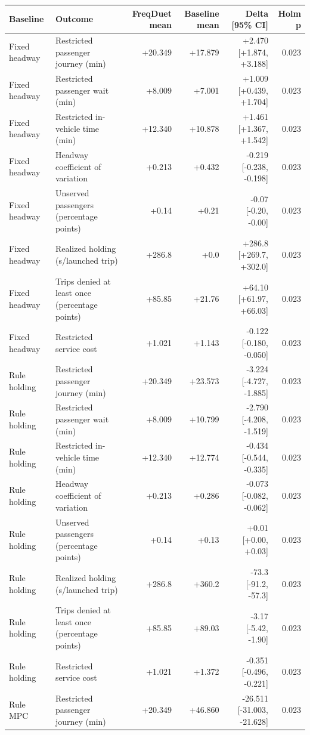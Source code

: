 \begin{tabular}{llrrrr}
\toprule
Baseline & Outcome & FreqDuet mean & Baseline mean & Delta [95\% CI] & Holm p \\
\midrule
Fixed headway & Restricted passenger journey (min) & +20.349 & +17.879 & +2.470 [+1.874, +3.188] & 0.023 \\
Fixed headway & Restricted passenger wait (min) & +8.009 & +7.001 & +1.009 [+0.439, +1.704] & 0.023 \\
Fixed headway & Restricted in-vehicle time (min) & +12.340 & +10.878 & +1.461 [+1.367, +1.542] & 0.023 \\
Fixed headway & Headway coefficient of variation & +0.213 & +0.432 & -0.219 [-0.238, -0.198] & 0.023 \\
Fixed headway & Unserved passengers (percentage points) & +0.14 & +0.21 & -0.07 [-0.20, -0.00] & 0.023 \\
Fixed headway & Realized holding (s/launched trip) & +286.8 & +0.0 & +286.8 [+269.7, +302.0] & 0.023 \\
Fixed headway & Trips denied at least once (percentage points) & +85.85 & +21.76 & +64.10 [+61.97, +66.03] & 0.023 \\
Fixed headway & Restricted service cost & +1.021 & +1.143 & -0.122 [-0.180, -0.050] & 0.023 \\
Rule holding & Restricted passenger journey (min) & +20.349 & +23.573 & -3.224 [-4.727, -1.885] & 0.023 \\
Rule holding & Restricted passenger wait (min) & +8.009 & +10.799 & -2.790 [-4.208, -1.519] & 0.023 \\
Rule holding & Restricted in-vehicle time (min) & +12.340 & +12.774 & -0.434 [-0.544, -0.335] & 0.023 \\
Rule holding & Headway coefficient of variation & +0.213 & +0.286 & -0.073 [-0.082, -0.062] & 0.023 \\
Rule holding & Unserved passengers (percentage points) & +0.14 & +0.13 & +0.01 [+0.00, +0.03] & 0.023 \\
Rule holding & Realized holding (s/launched trip) & +286.8 & +360.2 & -73.3 [-91.2, -57.3] & 0.023 \\
Rule holding & Trips denied at least once (percentage points) & +85.85 & +89.03 & -3.17 [-5.42, -1.90] & 0.023 \\
Rule holding & Restricted service cost & +1.021 & +1.372 & -0.351 [-0.496, -0.221] & 0.023 \\
Rule MPC & Restricted passenger journey (min) & +20.349 & +46.860 & -26.511 [-31.003, -21.628] & 0.023 \\

\end{tabular}
